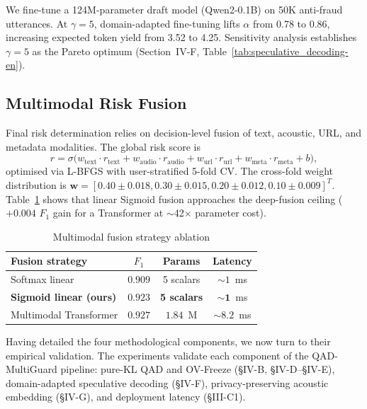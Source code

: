 \documentclass[final,5p,times,number]{elsarticle}
\begin{document}
We fine-tune a 124M-parameter draft model (Qwen2-0.1B) on 50K anti-fraud utterances. At $\gamma = 5$, domain-adapted fine-tuning lifts $\alpha$ from 0.78 to 0.86, increasing expected token yield from 3.52 to 4.25. Sensitivity analysis establishes $\gamma = 5$ as the Pareto optimum (Section~IV-F, Table~\ref{tab:speculative_decoding-en}).

\subsection{Multimodal Risk Fusion}

Final risk determination relies on decision-level fusion of text, acoustic, URL, and metadata modalities. The global risk score is
\begin{equation}
\label{eq:fusion}
r = \sigma\bigl(w_{\mathrm{text}}\cdot r_{\mathrm{text}}
+ w_{\mathrm{audio}}\cdot r_{\mathrm{audio}} + w_{\mathrm{url}}\cdot r_{\mathrm{url}} + w_{\mathrm{meta}}\cdot r_{\mathrm{meta}} + b\bigr),
\end{equation}
optimised via L-BFGS with user-stratified 5-fold CV. The cross-fold weight distribution is $\mathbf{w} = [0.40 \pm 0.018, 0.30 \pm 0.015, 0.20 \pm 0.012, 0.10 \pm 0.009]^T$. Table~\ref{tab:fusion_ablation-en} shows that linear Sigmoid fusion approaches the deep-fusion ceiling ($+0.004$ $F_1$ gain for a Transformer at $\sim$42$\times$ parameter cost).

\begin{table}[!t]
\centering
\caption{Multimodal fusion strategy ablation}
\label{tab:fusion_ablation-en}
\small
\renewcommand{\arraystretch}{1.15}
\begin{tabular}{lccc}
\toprule
\textbf{Fusion strategy} & \textbf{$F_1$} & \textbf{Params} & \textbf{Latency} \\
\midrule
Softmax linear & $0.909$ & 5 scalars & $\sim 1$~ms \\
\textbf{Sigmoid linear (ours)} & $\mathbf{0.923}$ & \textbf{5 scalars} & $\mathbf{\sim 1}$~ms \\
Multimodal Transformer & $0.927$ & $1.84$~M & $\sim 8.2$~ms \\
\bottomrule
\end{tabular}
\end{table}

Having detailed the four methodological components, we now turn to their empirical validation. The experiments validate each component of the QAD-MultiGuard pipeline: pure-KL QAD and OV-Freeze (\S{}IV-B, \S{}IV-D--\S{}IV-E), domain-adapted speculative decoding (\S{}IV-F), privacy-preserving acoustic embedding (\S{}IV-G), and deployment latency (\S{}III-C1).
\end{document}

